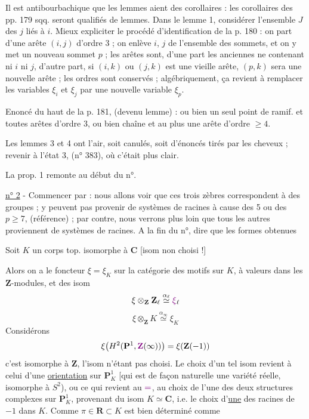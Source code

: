 Il est antibourbachique que les lemmes aient des corollaires : les corollaires des pp. 179 sqq. seront qualifiés de lemmes. Dans le lemme 1, considérer l'ensemble $J$ des $j$ liés à $i$. Mieux expliciter le procédé d'identification de la p. 180 : on part d'une arête $(i,j)$ d'ordre 3 ; on enlève $i$, $j$ de l'ensemble des sommets, et on y met un nouveau sommet $p$ ; les arêtes sont, d'une part les anciennes ne contenant ni $i$ ni $j$, d'autre part, si $(i,k)$ ou $(j,k)$ est une vieille arête, $(p,k)$ sera une nouvelle arête ; les ordres sont conservés ; algébriquement, ça revient à remplacer les variables $\xi_i$ et $\xi_j$ par une nouvelle variable $\xi_p$.

Enoncé du haut de la p. 181, (devenu lemme) : ou bien un seul point de ramif. et toutes arêtes d'ordre 3, ou bien chaîne et au plus une arête d'ordre $\geq4$.

Les lemmes 3 et 4 ont l'air, soit canulés, soit d'énoncés tirés par les cheveux ; revenir à l'état 3, (n° 383), où c'était plus clair.

La prop. 1 remonte au début du n°.

\uline{n° 2} - Commencer par : nous allons voir que ces trois zèbres correspondent à des groupes ; y peuvent pas provenir de systèmes de racines à cause des 5 ou des $p\geq7$, (référence) ; par contre, nous verrons plus loin que tous les autres proviennent de systèmes de racines. A la fin du n°, dire que les formes obtenues


Soit $K$ un corps top. isomorphe à $\mathbf C$ [isom non choisi !]

Alors on a le foncteur  $\xi=\xi_K$ sur la catégorie des motifs sur $K$, à valeurs dans les $\mathbf Z$-modules, et des isom
\[
 \xi\otimes_{\mathbf Z}\mathbf Z_\ell\overset{\alpha_\ell}{\simeq}\unsure{\xi}_\ell
\]
\[
 \xi\otimes_{\mathbf Z}K\overset{\alpha_\infty}{\simeq}\xi_K
\]
Considérons
\[
 \xi\bigl(H^2(\mathbf P^1,\unsure{\mathbf Z}(\infty))\bigr)=\xi(\mathbf Z(-1))
\]
c'est isomorphe à $\mathbf Z$, l'isom n'étant pas choisi. Le choix d'un tel isom  revient à celui d'une \uline{orientation} sur $\mathbf P_K^1$ [qui est de façon naturelle une variété  réelle, isomorphe à $S^2$), ou ce qui revient au $\unsure{=}$, au choix de l'une des deux structures complexes sur $\mathbf P_K^1$, provenant du  isom $K\simeq\mathbf C$, i.e. le choix d'\uline{une} des racines de $-1$ dans $K$. Comme $\pi\in\mathbf R\subset K$ est bien déterminé comme

